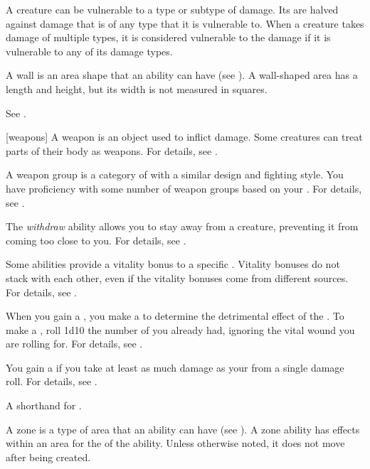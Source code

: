  A creature can be vulnerable to a type or subtype of damage.
Its  are halved against damage that is of any type that it is vulnerable to.
When a creature takes damage of multiple types, it is considered vulnerable to the damage if it is vulnerable to any of its damage types.

 A wall is an area shape that an ability can have (see ).
A wall-shaped area has a length and height, but its width is not measured in squares.

 See .

[weapons] A weapon is an object used to inflict damage.
Some creatures can treat parts of their body as weapons.
For details, see .

 A weapon group is a category of  with a similar design and fighting style.
You have proficiency with some number of weapon groups based on your .
For details, see .

 The \textit{withdraw} ability allows you to stay away from a creature, preventing it from coming too close to you.
For details, see .

 Some abilities provide a vitality bonus to a specific .
Vitality bonuses do not stack with each other, even if the vitality bonuses come from different sources.
For details, see .

 When you gain a , you make a  to determine the detrimental effect of the .
To make a , roll 1d10 \sub the number of  you already had, ignoring the vital wound you are rolling for.
For details, see .

 You gain a  if you take at least as much damage as your  from a single damage roll.
For details, see .

 A shorthand for .

 A zone is a type of area that an ability can have (see ).
A zone ability has effects within an area for the  of the ability.
Unless otherwise noted, it does not move after being created.
